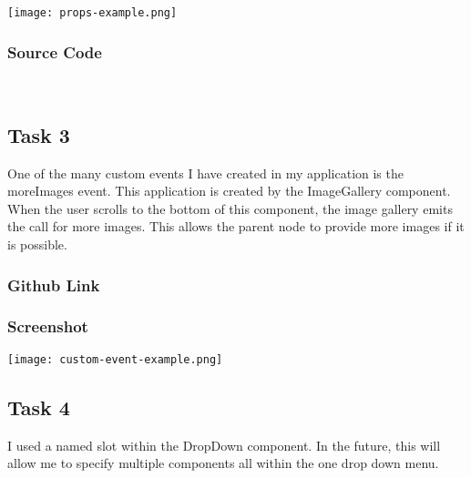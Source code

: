 \documentclass[portfolio.tex]{subfiles}
\begin{document}
	\begin{center}
		\texttt{[image: props-example.png]}
	\end{center}

	\subsubsection{Source Code}

		\\

	\subsection{Task 3}

	One of the many custom events I have created in my application is the moreImages event. This application is created by the ImageGallery component. When the user scrolls to the bottom of this component, the image gallery emits the call for more images. This allows the parent node to provide more images if it is possible.

	\subsubsection{Github Link}


	\subsubsection{Screenshot}

	\begin{center}
		\texttt{[image: custom-event-example.png]}
	\end{center}

	\subsection{Task 4}
		I used a named slot within the DropDown component. In the future, this will allow me to specify multiple components all within the one drop down menu.
\end{document}
